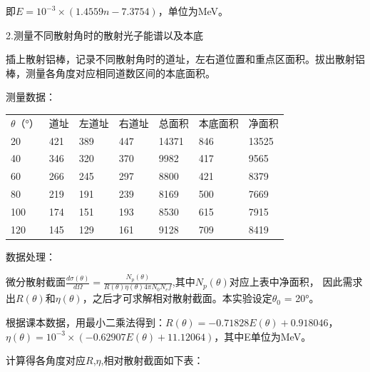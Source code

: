 \documentclass[font=default]{mpltx}
\begin{document}
即$E = 10^{-3} \times (1.4559n - 7.3754)$，单位为MeV。

2.测量不同散射角时的散射光子能谱以及本底

插上散射铝棒，记录不同散射角时的道址，左右道位置和重点区面积。拔出散射铝棒，测量各角度对应相同道数区间的本底面积。

测量数据：
\begin{table}[]
\begin{tabular}{llll}
$\theta$（°）         & 道址                 &左道址            &右道址          &总面积    &本底面积    &净面积 \\
20                   & 421                  &389                &447            &14371    &846        &13525 \\
40                   & 346                   &320                &370           &9982     &417        &9565 \\
60                   & 266                   &245                &297           &8800     &421        &8379  \\
80                   & 219                  &191                  &239          &8169     &500        &7669  \\
100                  & 174                  &151                 &193           &8530     &615        &7915  \\
120                  &145                   &129                 &161           &9128     &709        &8419  \\
\end{tabular}
\end{table}

数据处理：

微分散射截面$\frac{d \sigma (\theta)}{d \Omega} = \frac{N_p(\theta)}{R(\theta)\eta(\theta)4 \pi N_0 N_e f}$,其中$N_p(\theta)$对应上表中净面积，
因此需求出$R(\theta)$和$\eta(\theta)$，之后才可求解相对散射截面。本实验设定$\theta_0$ = 20°。

根据课本数据，用最小二乘法得到：$R(\theta) =-0.71828 E(\theta) + 0.918046$，
$\eta(\theta) = 10^{-3} \times (-0.62907E(\theta) + 11.12064)$，其中E单位为MeV。

计算得各角度对应$R$,$\eta$,相对散射截面如下表：
\end{document}
